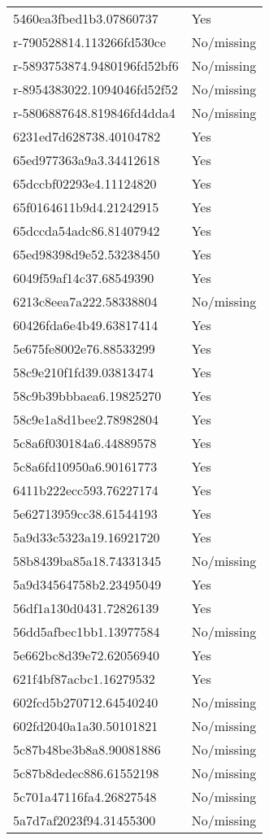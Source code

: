 \begin{tabular}{ll}
5460ea3fbed1b3.07860737 & Yes \\
r-790528814.113266fd530ce & No/missing \\
r-5893753874.9480196fd52bf6 & No/missing \\
r-8954383022.1094046fd52f52 & No/missing \\
r-5806887648.819846fd4dda4 & No/missing \\
6231ed7d628738.40104782 & Yes \\
65ed977363a9a3.34412618 & Yes \\
65dccbf02293e4.11124820 & Yes \\
65f0164611b9d4.21242915 & Yes \\
65dccda54adc86.81407942 & Yes \\
65ed98398d9e52.53238450 & Yes \\
6049f59af14c37.68549390 & Yes \\
6213c8eea7a222.58338804 & No/missing \\
60426fda6e4b49.63817414 & Yes \\
5e675fe8002e76.88533299 & Yes \\
58c9e210f1fd39.03813474 & Yes \\
58c9b39bbbaea6.19825270 & Yes \\
58c9e1a8d1bee2.78982804 & Yes \\
5c8a6f030184a6.44889578 & Yes \\
5c8a6fd10950a6.90161773 & Yes \\
6411b222ecc593.76227174 & Yes \\
5e62713959cc38.61544193 & Yes \\
5a9d33c5323a19.16921720 & Yes \\
58b8439ba85a18.74331345 & No/missing \\
5a9d34564758b2.23495049 & Yes \\
56df1a130d0431.72826139 & Yes \\
56dd5afbec1bb1.13977584 & No/missing \\
5e662bc8d39e72.62056940 & Yes \\
621f4bf87acbc1.16279532 & Yes \\
602fcd5b270712.64540240 & No/missing \\
602fd2040a1a30.50101821 & No/missing \\
5c87b48be3b8a8.90081886 & No/missing \\
5c87b8dedec886.61552198 & No/missing \\
5c701a47116fa4.26827548 & No/missing \\
5a7d7af2023f94.31455300 & No/missing \\

\end{tabular}
